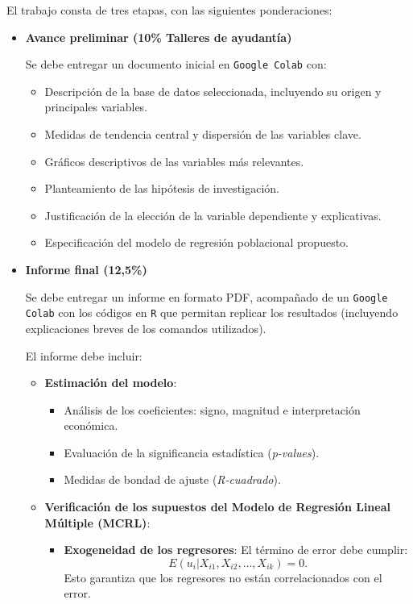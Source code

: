 \documentclass[a4paper,12pt]{article}
\begin{document}
El trabajo consta de tres etapas, con las siguientes ponderaciones:

\begin{itemize}
    \item \textbf{Avance preliminar (10\% Talleres de ayudantía)}
    
    Se debe entregar un documento inicial en \texttt{Google Colab} con:
    \begin{itemize}
        \item Descripción de la base de datos seleccionada, incluyendo su origen y principales variables.
        \item Medidas de tendencia central y dispersión de las variables clave.
        \item Gráficos descriptivos de las variables más relevantes.
        \item Planteamiento de las hipótesis de investigación.
        \item Justificación de la elección de la variable dependiente y explicativas.
        \item Especificación del modelo de regresión poblacional propuesto.
    \end{itemize}
    
    \item \textbf{Informe final (12,5\%)}

    Se debe entregar un informe en formato PDF, acompañado de un \texttt{Google Colab} con los códigos en \texttt{R} que permitan replicar los resultados (incluyendo explicaciones breves de los comandos utilizados).
    
    El informe debe incluir:
    
    \begin{itemize}
        \item \textbf{Estimación del modelo}: 
        \begin{itemize}
            \item Análisis de los coeficientes: signo, magnitud e interpretación económica.
            \item Evaluación de la significancia estadística (\textit{p-values}).
            \item Medidas de bondad de ajuste (\textit{R-cuadrado}).
        \end{itemize}

      

        \item \textbf{Verificación de los supuestos del Modelo de Regresión Lineal Múltiple (MCRL)}:
        \begin{itemize}
            \item \textbf{Exogeneidad de los regresores}: El término de error debe cumplir:
            \[
            E(u_i | X_{i1}, X_{i2}, \dots, X_{ik}) = 0.
            \]
            Esto garantiza que los regresores no están correlacionados con el error.


\end{itemize}
\end{itemize}
\end{itemize}
\end{document}
